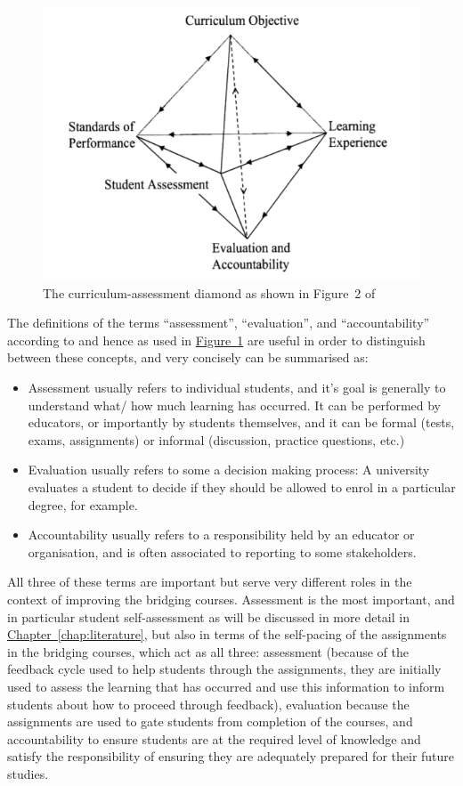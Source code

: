 \documentclass[twoside,12pt,a4paper]{report}
\newcommand{\refchap}[1]{\hyperref[chap:#1]{Chapter~\ref{chap:#1}}}
\newcommand{\reffig}[1]{\hyperref[fig:#1]{Figure~\ref{fig:#1}}}
\begin{document}
\begin{figure}[ht]
\centering
\includegraphics{./figures/curriculum-assessment-model.PNG}
\caption{The curriculum-assessment diamond as shown in Figure~2 of \protect{} \label{fig:diamond}}
\end{figure}

The definitions of the terms ``assessment'', ``evaluation'', and ``accountability'' according to  and hence as used in \reffig{diamond} are useful in order to distinguish between these concepts, and very concisely can be summarised as:
\begin{itemize}
	\item Assessment usually refers to individual students, and it's goal is generally to understand what/ how much learning has occurred. It can be performed by educators, or importantly by students themselves, and it can be formal (tests, exams, assignments) or informal (discussion, practice questions, etc.)
	\item Evaluation usually refers to some a decision making process: A university evaluates a student to decide if they should be allowed to enrol in a particular degree, for example.
	\item Accountability usually refers to a responsibility held by an educator or organisation, and is often associated to reporting to some stakeholders. 
\end{itemize}
All three of these terms are important but serve very different roles in the context of improving the bridging courses. Assessment is the most important, and in particular student self-assessment as will be discussed in more detail in \refchap{literature}, but also in terms of the self-pacing of the assignments in the bridging courses, which act as all three: assessment (because of the feedback cycle used to help students through the assignments, they are initially used to assess the learning that has occurred and use this information to inform students about how to proceed through feedback), evaluation because the assignments are used to gate students from completion of the courses, and accountability to ensure students are at the required level of knowledge and satisfy the responsibility of ensuring they are adequately prepared for their future studies. 
\end{document}
